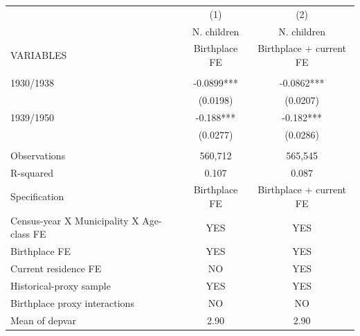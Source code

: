 \begin{tabular}{lcc} \hline
 & (1) & (2) \\
 & N. children & N. children \\
VARIABLES & Birthplace FE & Birthplace + current FE \\ \hline
 &  &  \\
1930/1938 & -0.0899*** & -0.0862*** \\
 & (0.0198) & (0.0207) \\
1939/1950 & -0.188*** & -0.182*** \\
 & (0.0277) & (0.0286) \\
 &  &  \\
Observations & 560,712 & 565,545 \\
R-squared & 0.107 & 0.087 \\
Specification & Birthplace FE & Birthplace + current FE \\
Census-year X Municipality X Age-class FE & YES & YES \\
Birthplace FE & YES & YES \\
Current residence FE & NO & YES \\
Historical-proxy sample & YES & YES \\
Birthplace proxy interactions & NO & NO \\
Mean of depvar & 2.90 & 2.90 \\ \hline
\end{tabular}

